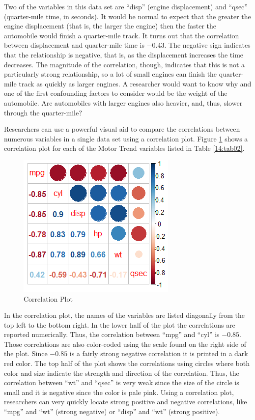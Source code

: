 Two of the variables in this data set are ``disp'' (engine displacement) and ``qsec'' (quarter-mile time, in seconds). It would be normal to expect that the greater the engine displacement (that is, the larger the engine) then the faster the automobile would finish a quarter-mile track. It turns out that the correlation between displacement and quarter-mile time is $ -0.43 $. The negative sign indicates that the relationship is negative, that is, as the displacement increases the time decreases. The magnitude of the correlation, though, indicates that this is not a particularly strong relationship, so a lot of small engines can finish the quarter-mile track as quickly as larger engines. A researcher would want to know why and one of the first confounding factors to consider would be the weight of the automobile. Are automobiles with larger engines also heavier, and, thus, slower through the quarter-mile?

Researchers can use a powerful visual aid to compare the correlations between numerous variables in a single data set using a correlation plot. Figure \ref{14:fig04} shows a correlation plot for each of the Motor Trend variables listed in Table \ref{14:tab02}.

\begin{figure}[H]
	\centering
	\includegraphics[width=\maxwidth{.95\linewidth}]{gfx/14-corplot}
	\caption{Correlation Plot}
	\label{14:fig04}
\end{figure}

In the correlation plot, the names of the variables are listed diagonally from the top left to the bottom right. In the lower half of the plot the correlations are reported numerically. Thus, the correlation between ``mpg'' and ``cyl'' is $ -0.85 $. Those correlations are also color-coded using the scale found on the right side of the plot. Since $ -0.85 $ is a fairly strong negative correlation it is printed in a dark red color. The top half of the plot shows the correlations using circles where both color and size indicate the strength and direction of the correlation. Thus, the correlation between ``wt'' and ``qsec'' is very weak since the size of the circle is small and it is negative since the color is pale pink. Using a correlation plot, researchers can very quickly locate strong positive and negative correlations, like ``mpg'' and ``wt'' (strong negative) or ``disp'' and ``wt'' (strong positive).

